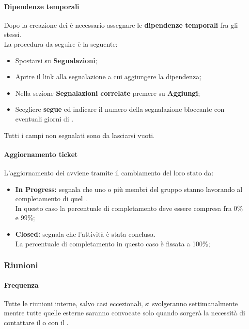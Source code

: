           \paragraph{Dipendenze temporali}
            Dopo la creazione dei  è necessario assegnare le \textbf{dipendenze temporali} fra gli stessi.\\
            La procedura da seguire è la seguente:
            \begin{itemize}
              \item Spostarsi su \textbf{Segnalazioni};
              \item Aprire il link alla segnalazione a cui aggiungere la dipendenza;
              \item Nella sezione \textbf{Segnalazioni correlate} premere su \textbf{Aggiungi};
              \item Scegliere \textbf{segue} ed indicare il numero della segnalazione bloccante con eventuali giorni di .
            \end{itemize}
            Tutti i campi non segnalati sono da lasciarsi vuoti.
        \paragraph{Aggiornamento ticket}
          L'aggiornamento dei  avviene tramite il cambiamento del loro stato da:
          \begin{itemize}
            \item \textbf{In Progress: }segnala che uno o più membri del gruppo stanno lavorando al completamento di quel .\\
            In questo caso la percentuale di completamento deve essere compresa fra 0\% e 99\%;
            \item \textbf{Closed: }segnala che l'attività è stata conclusa.\\
            La percentuale di completamento in questo caso è fissata a 100\%;
          \end{itemize}
    \subsubsection{Riunioni}
      \paragraph{Frequenza}
        Tutte le riunioni interne, salvo casi eccezionali, si svolgeranno settimanalmente mentre tutte quelle esterne saranno convocate solo quando sorgerà la necessità di contattare il  o con il .
